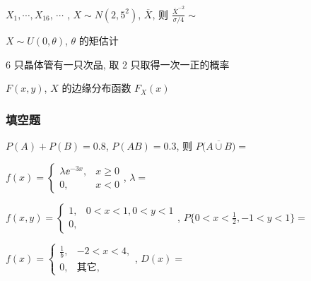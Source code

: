 \begin{ti}
	$X_1, \cdots, X_{16}$, $\cdots$ , $X \sim N(2,5^2)$, $\overline{X}$, 则 $\frac{\overline{X}^{-2}}{ \sigma/4 } \sim $ \kuo
\end{ti}

\begin{ti}
	$X \sim U(0, \theta)$, $\theta$ 的矩估计 \kuo
\end{ti}

\begin{ti}
	6 只晶体管有一只次品, 取 2 只取得一次一正的概率 \kuo
\end{ti}

\begin{ti}
	$F(x,y)$, $X$ 的边缘分布函数 $F_X(x)$ \kuo
\end{ti}

\subsubsection{填空题}
\begin{ti}
	$P(A) + P(B) = 0.8$, $P(AB) = 0.3$, 则 $P \bigl( \overline{A \cup B} \bigr) = $ \hua
\end{ti}

\begin{ti}
	$f(x) = \begin{cases}
		\lambda \ee^{-3x}, 	& x \geqslant 0 \\
		0, 									& x < 0
	\end{cases}$, $\lambda = $ \hua
\end{ti}

\begin{ti}
	$f(x,y) = \begin{cases}
		1,	& 0<x<1,0<y<1	\\
		0,
	\end{cases}$, $P\bigl\{ 0 < x < \frac{1}{2}, -1 < y < 1 \bigr\} = $ \hua
\end{ti}

\begin{ti}
	$f(x) = \begin{cases}
		\frac{1}{b}, & -2<x<4, \\
		0,					 & \text{其它},
	\end{cases}$, $D(x) = $ \hua
\end{ti}

